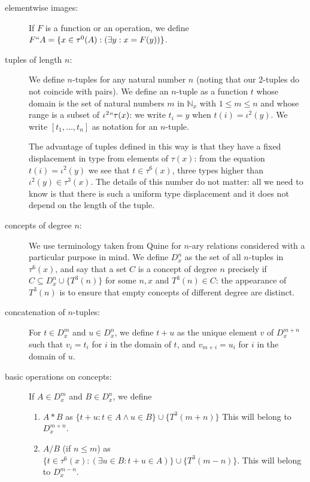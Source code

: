 \documentclass[12pt]{article}
\begin{document}
\begin{description}
\item[elementwise images:]  If $F$ is a function or an operation, we define $F``A = \{x\in \tau^0(A):(\exists y: x = F(y))\}$.

\item[tuples of length $n$:]  We define $n$-tuples for any natural number $n$ (noting that our 2-tuples do not coincide with pairs).  We define an $n$-tuple as a function $t$ whose domain is the set of  natural numbers $m$ in $\mathbb N_x$ 
with $1 \leq m \leq n$ and whose range is a subset of $\iota^2``\tau(x)$:  we write $t_i = y$ when $t(i) = \iota^2(y)$.
We write $[t_1,\ldots,t_n]$ as notation for an $n$-tuple.

The advantage of tuples defined in this way is that they have a fixed displacement in type from elements of $\tau(x)$:
from the equation $t(i) = \iota^2(y)$ we see that $t \in \tau^6(x)$, three types higher than $\iota^2(y)\in \tau^3(x)$.  The details of this number do not matter:  all we need to know is that there is such a uniform type displacement and it does not depend on the length of the tuple.

\item[concepts of degree $n$:]  We use terminology taken from Quine for $n$-ary relations considered with a particular purpose in mind.  We define $D^n_x$ as the set of all $n$-tuples in $\tau^6(x)$, and say that a set $C$ is a concept of degree $n$ precisely if $C \subseteq D^n_x \cup \{T^3(n)\}$ for some $n,x$ and $T^3(n) \in C$:  the appearance
of $T^3(n)$ is to ensure that empty concepts of different degree are distinct.

\item[concatenation of $n$-tuples:]  For $t \in D^m_x$ and $u \in D^n_x$, we define $t+u$ as the unique
element $v$ of $D^{m+n}_x$ such that $v_i = t_i$ for $i$ in the domain of $t$, and $v_{m+i}=u_i$ for $i$ in the domain of $u$.

\item[basic operations on concepts:]  If $A \in D^m_x$ and $B \in D^n_x$, we define

\begin{enumerate}

\item $A*B$ as $\{t+u:t \in A \wedge u \in B\}\cup \{T^3(m+n)\}$  This will belong to $D^{m+n}_x$.

\item $A/B$ (if $n \leq m$) as $\{t \in \tau^6(x):(\exists u \in B:t+u \in A)\} \cup \{T^3(m-n)\}$.  This will belong to $D^{m-n}_x$.


\end{enumerate}
\end{description}
\end{document}
